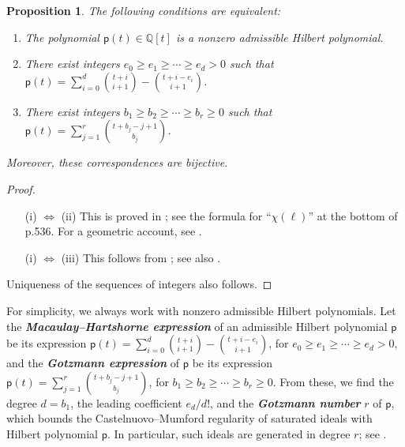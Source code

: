\documentclass[12pt]{amsart}%
\newtheorem{proposition}[theorem]{Proposition}
\theoremstyle{definition}%
\newcommand{\hp}{\mathsf{p}}%
\newcommand{\QQ}{\mathbb{Q}}%
\begin{document}
\begin{proposition} 
  \label{prop:expressions}
  The following conditions are equivalent:
  \begin{enumerate}
  \item The polynomial $\hp(t) \in \QQ[t]$ is a nonzero admissible
    Hilbert polynomial.
    
  \item There exist integers $e_0 \ge e_1 \ge \dotsb \ge e_d > 0$ such
    that $\hp(t) = \sum_{i=0}^{d} \binom{t + i}{i + 1} - \binom{t + i
      - e_i}{i + 1}$.

  \item There exist integers $b_1 \ge b_2 \ge \dotsb \ge b_r \ge 0$
    such that $\hp(t) = \sum_{j=1}^r \binom{t + b_j - j+1}{b_j}$.
  \end{enumerate}
  Moreover, these correspondences are bijective.
\end{proposition}

\begin{proof} $\;$
  \begin{enumerate}[leftmargin=2cm]
  \item[(i) $\Leftrightarrow$ (ii)] This is proved in
    \cite{Macaulay--1927}; see the formula for ``$\chi(\ell)$'' at the
    bottom of p.536.  For a geometric account, see \cite[Corollary~3.3
      and Corollary~5.7]{Hartshorne--1966}.

  \item[(i) $\Leftrightarrow$ (iii)] This follows from
    \cite[Erinnerung~2.4]{Gotzmann--1978}; see also
    \cite[Exercise~4.2.17]{Bruns--Herzog--1993}.
  \end{enumerate}
  Uniqueness of the sequences of integers also follows.
\end{proof}

For simplicity, we always work with nonzero admissible Hilbert
polynomials.  Let the \emph{\bfseries Macaulay--Hartshorne expression}
of an admissible Hilbert polynomial $\hp$ be its expression $\hp(t) =
\sum_{i=0}^{d} \binom{t + i}{i + 1} - \binom{t + i - e_i}{i + 1}$, for
$e_0 \ge e_1 \ge \dotsb \ge e_d > 0$, and the \emph{\bfseries Gotzmann
  expression} of $\hp$ be its expression $\hp(t) = \sum_{j=1}^{r}
\binom{t + b_j - j+1}{b_j}$, for $b_1 \ge b_2 \ge \dotsb \ge b_r \ge
0$.  From these, we find the degree $d = b_1$, the leading coefficient
$e_d / d!$, and the \emph{\bfseries Gotzmann number} $r$ of $\hp$,
which bounds the Castelnuovo--Mumford regularity of saturated ideals
with Hilbert polynomial $\hp$.  In particular, such ideals are
generated in degree $r$; see
\cite[p.~300-301]{Iarrobino--Kanev--1999}.
\end{document}
